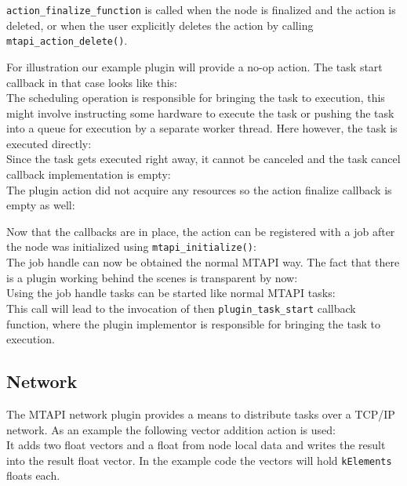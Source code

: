 \lstinline|action_finalize_function| is called when the node is finalized and the action is deleted, or when the user explicitly deletes the action by calling \lstinline|mtapi_action_delete()|.

For illustration our example plugin will provide a no-op action. The task start callback in that case looks like this:
%
\\
%
The scheduling operation is responsible for bringing the task to execution, this might involve instructing some hardware to execute the task or pushing the task into a queue for execution by a separate worker thread. Here however, the task is executed directly:
%
\\
%
Since the task gets executed right away, it cannot be canceled and the task cancel callback implementation is empty:
%
\\
%
The plugin action did not acquire any resources so the action finalize callback is empty as well:
%
\\
%

Now that the callbacks are in place, the action can be registered with a job after the node was initialized using \lstinline|mtapi_initialize()|:
%
\\
%
The job handle can now be obtained the normal MTAPI way. The fact that there is a plugin working behind the scenes is transparent by now:
%
\\
%
Using the job handle tasks can be started like normal MTAPI tasks:
%
\\
%
This call will lead to the invocation of then \lstinline|plugin_task_start| callback function, where the plugin implementor is responsible for bringing the task to execution.

\subsection{Network}

The MTAPI network plugin provides a means to distribute tasks over a TCP/IP network. As an example the following vector addition action is used:
%
\\
%
It adds two float vectors and a float from node local data and writes the result into the result float vector. In the example code the vectors will hold \lstinline|kElements| floats each.

